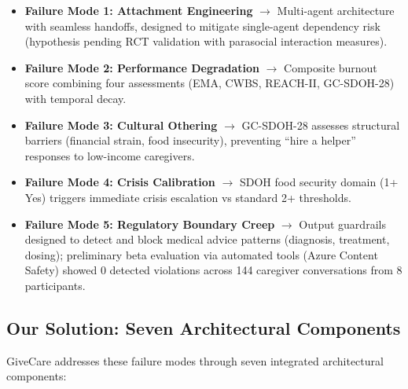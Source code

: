 \documentclass{article}
\begin{document}
\begin{itemize}
    \item \textbf{Failure Mode 1: Attachment Engineering} $\rightarrow$ Multi-agent architecture with seamless handoffs, designed to mitigate single-agent dependency risk (hypothesis pending RCT validation with parasocial interaction measures).
    \item \textbf{Failure Mode 2: Performance Degradation} $\rightarrow$ Composite burnout score combining four assessments (EMA, CWBS, REACH-II, GC-SDOH-28) with temporal decay.
    \item \textbf{Failure Mode 3: Cultural Othering} $\rightarrow$ GC-SDOH-28 assesses structural barriers (financial strain, food insecurity), preventing ``hire a helper'' responses to low-income caregivers.
    \item \textbf{Failure Mode 4: Crisis Calibration} $\rightarrow$ SDOH food security domain (1+ Yes) triggers immediate crisis escalation vs standard 2+ thresholds.
    \item \textbf{Failure Mode 5: Regulatory Boundary Creep} $\rightarrow$ Output guardrails designed to detect and block medical advice patterns (diagnosis, treatment, dosing); preliminary beta evaluation via automated tools (Azure Content Safety) showed 0 detected violations across 144 caregiver conversations from 8 participants.
\end{itemize}

\subsection{Our Solution: Seven Architectural Components}

GiveCare addresses these failure modes through seven integrated architectural components:
\end{document}

